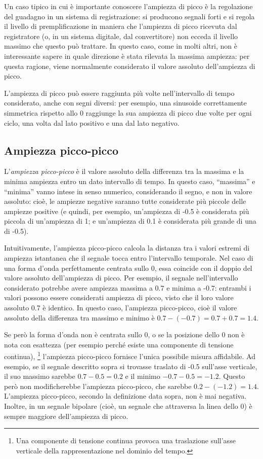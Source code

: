 Un caso tipico in cui è importante conoscere l'ampiezza di picco è la regolazione del guadagno in un sistema di registrazione: si producono segnali forti e si regola il livello di premplificazione in maniera che l'ampiezza di picco ricevuta dal registratore (o, in un sistema digitale, dal convertitore) non ecceda il livello massimo che questo può trattare. In questo caso, come in molti altri, non è interessante sapere in quale direzione è stata rilevata la massima ampiezza: per questa ragione, viene normalmente considerato il valore assoluto dell'ampiezza di picco. 

L'ampiezza di picco può essere raggiunta più volte nell'intervallo di tempo considerato, anche con segni diversi: per esempio, una sinusoide correttamente simmetrica rispetto allo 0 raggiunge la sua ampiezza di picco due volte per ogni ciclo, una volta dal lato positivo e una dal lato negativo.



\subsection{Ampiezza picco-picco}

L'\emph{ampiezza picco-picco} è il valore assoluto della differenza tra la massima e la minima ampiezza entro un dato intervallo di tempo. In questo caso, ``massima'' e ``minima'' vanno intese in senso numerico, considerando il segno, e non in valore assoluto: cioè, le ampiezze negative saranno tutte considerate più piccole delle ampiezze positive (e quindi, per esempio, un'ampiezza di -0.5 è considerata più piccola di un'ampiezza di 1; e un'ampiezza di 0.1 è considerata più grande di una di -0.5). 

Intuitivamente, l'ampiezza picco-picco calcola la distanza tra i valori estremi di ampiezza istantanea che il segnale tocca entro l'intervallo temporale. Nel caso di una forma d'onda perfettamente centrata sullo 0, essa coincide con il doppio del valore assoluto dell'ampiezza di picco. Per esempio, il segnale nell'intervallo considerato potrebbe avere ampiezza massima a 0.7 e minima a -0.7: entrambi i valori possono essere considerati ampiezza di picco, visto che il loro valore assoluto 0.7 è identico. In questo caso, l'ampiezza picco-picco, cioè il valore assoluto della differenza tra massimo e minimo è $0.7 - (-0.7) = 0.7 + 0.7 = 1.4$. 

Se però la forma d'onda non è centrata sullo 0, o se la posizione dello 0 non è nota con esattezza (per esempio perché esiste una componente di tensione continua),%
\footnote{Una componente di tensione continua provoca una traslazione sull'asse verticale della rappresentazione nel dominio del tempo.}
l'ampiezza picco-picco fornisce l'unica possibile misura affidabile. Ad esempio, se il segnale descritto sopra si trovasse traslato di -0.5 sull'asse verticale, il suo massimo sarebbe $0.7 - 0.5 = 0.2$ e il minimo $-0.7 - 0.5 = -1.2$. Questo però non modificherebbe l'ampiezza picco-picco, che sarebbe $0.2 - (-1.2) = 1.4$. L'ampiezza picco-picco, secondo la definizione data sopra, non è mai negativa. Inoltre, in un segnale bipolare (cioè, un segnale che attraversa la linea dello 0) è sempre maggiore dell'ampiezza di picco.




